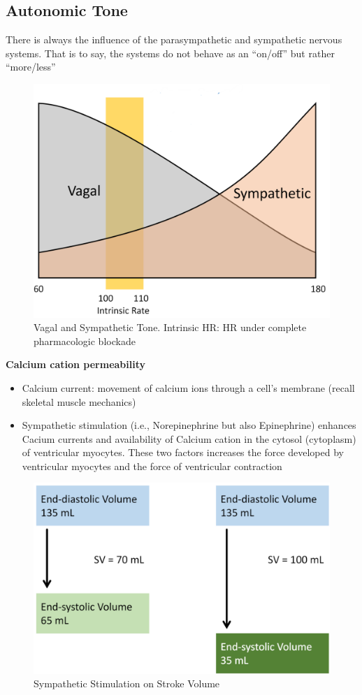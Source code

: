 \documentclass[11pt,fleqn]{book} %
\begin{document}
\subsection{Autonomic Tone}
There is always the influence of the parasympathetic
and sympathetic nervous systems. That is to say, the
systems do not behave as an “on/off” but rather
“more/less”

\begin{figure}[h!]
\begin{center}
    \includegraphics[width=0.6\linewidth]{Pictures/Screenshot 2024-04-04 012358.png}
\end{center}
    \caption{Vagal and Sympathetic Tone. Intrinsic HR:
HR under
complete
pharmacologic
blockade
}
\end{figure}

\textbf{Calcium cation permeability}
\begin{itemize}
    \item Calcium current: movement of
calcium ions through a cell’s
membrane (recall skeletal
muscle mechanics)
    \item Sympathetic stimulation (i.e., Norepinephrine but
also Epinephrine) enhances Cacium currents and
availability of Calcium cation in the cytosol (cytoplasm) of
ventricular myocytes. These two factors increases the
force developed by ventricular myocytes and the
force of ventricular contraction
\end{itemize}


\begin{figure}[h!]
\begin{center}
    \includegraphics[width=0.6\linewidth]{Pictures/Screenshot 2024-04-04 012811.png}
\end{center}
    \caption{Sympathetic Stimulation on
Stroke Volume
}
\end{figure}
\end{document}
